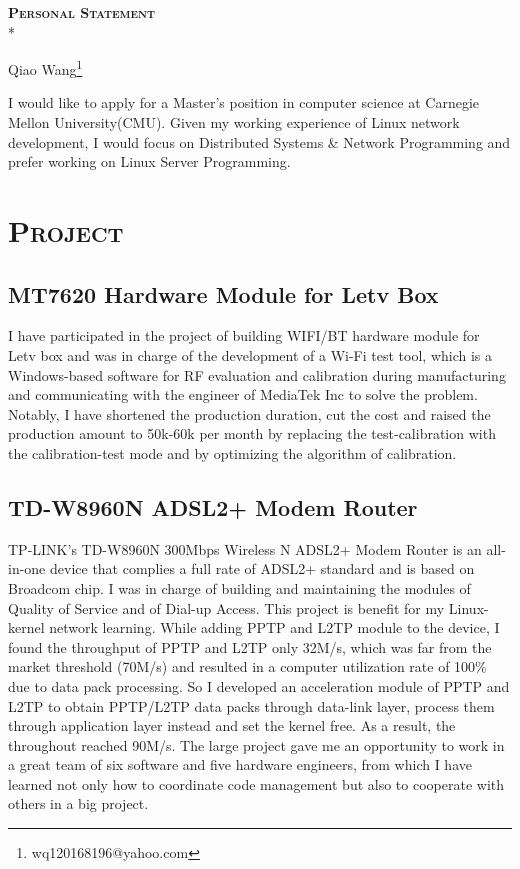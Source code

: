 \documentclass{article}
\begin{document}
	\begin{center}
		\textsc{\textbf{{\LARGE{}Personal Statement}}}\\*
	\end{center}
	\begin{center}
		Qiao Wang\footnote{wq120168196@yahoo.com}
	\end{center}
	
	\begin{multicols}{2}
		I would like to apply for a Master's position in computer science at Carnegie Mellon University(CMU). Given my working experience of Linux network development, I would focus on Distributed Systems \& Network Programming and prefer working on Linux Server Programming.
		\section{\textsc{Project}}
		\subsection{MT7620 Hardware Module for Letv Box}
		I have participated in the project of building WIFI/BT hardware module for Letv box and was in charge of the development of a Wi-Fi test tool, which is a Windows-based software for RF evaluation and calibration during manufacturing and communicating with the engineer of MediaTek Inc to solve the problem. Notably, I have shortened the production duration, cut the cost and raised the production amount to 50k-60k per month by replacing the test-calibration with the calibration-test mode and by optimizing the algorithm of calibration.
		\subsection{TD-W8960N ADSL2+ Modem Router}
		TP-LINK’s TD-W8960N 300Mbps Wireless N ADSL2+ Modem Router is an all-in-one device that complies a full rate of ADSL2+ standard and is based on Broadcom chip. I was in charge of building and maintaining the modules of Quality of Service and of Dial-up Access. This project is benefit for my Linux-kernel network learning. While adding PPTP and L2TP module to the device, I found the throughput of PPTP and L2TP only 32M/s, which was far from the market threshold (70M/s) and resulted in a computer utilization rate of 100\% due to data pack processing. So I developed an acceleration module of PPTP and L2TP to obtain PPTP/L2TP data packs through data-link layer, process them through application layer instead and set the kernel free. As a result, the throughout reached 90M/s. The large project gave me an opportunity to work in a great team of six software and five hardware engineers, from which I have learned not only how to coordinate code management but also to cooperate with others in a big project.

\end{multicols}
\end{document}
